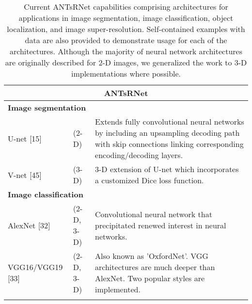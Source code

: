 

\begin{table}[!htb]
\centering
\caption{Current ANTsRNet capabilities comprising architectures for applications in 
image segmentation, image classification, object localization, and image super-resolution.  Self-contained
examples with data are also provided to demonstrate usage for each of the architectures.
Although the majority of neural network architectures are originally described
for 2-D images, we generalized the work to 3-D implementations where possible.}
\label{table:antsrnet}
\begin{tabular*}{\textwidth}{ll@{\extracolsep{\fill}}l}
\toprule
\multicolumn{3}{c}{\textbf{ANTsRNet}}    \\        
\midrule
\multicolumn{3}{l}{\textbf{Image segmentation}}
  \vspace{0.25cm} \\ \vspace{0.2cm} 
  U-net [15] & (2-D) & 
    \begin{minipage}[t]{0.6\columnwidth}%
        Extends fully convolutional neural networks by 
        including an upsampling decoding path with skip connections 
        linking corresponding encoding/decoding layers. %
    \end{minipage} \\ \vspace{0.3cm} 
  V-net [45] & (3-D) &
    \begin{minipage}[t]{0.6\columnwidth}%
        3-D extension of U-net which incorporates a customized
        Dice loss function. %
    \end{minipage} \\
\midrule
\multicolumn{3}{l}{\textbf{Image classification}} 
  \vspace{0.25cm} \\ \vspace{0.2cm} 
  AlexNet [32] & (2-D, 3-D) & 
    \begin{minipage}[t]{0.6\columnwidth}%
        Convolutional neural network that precipitated renewed
        interest in neural networks.
    \end{minipage} \\ \vspace{0.2cm} 
  VGG16/VGG19 [33] & (2-D, 3-D) & 
    \begin{minipage}[t]{0.6\columnwidth}%
        Also known as 'OxfordNet'.  VGG architectures are much 
        deeper than AlexNet.  Two popular styles are implemented. %
    \end{minipage} \\ \vspace{0.2cm} 

\end{tabular*}
\end{table}
